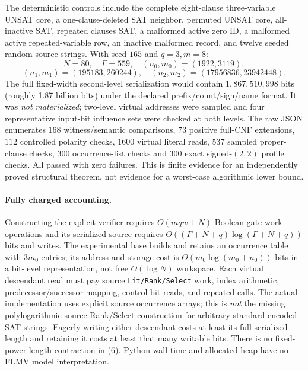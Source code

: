 \documentclass[11pt]{article}
\begin{document}
The deterministic controls include the complete eight-clause three-variable UNSAT core, a one-clause-deleted SAT neighbor, permuted UNSAT core, all-inactive SAT, repeated clauses SAT, a malformed active zero ID, a malformed active repeated-variable row, an inactive malformed record, and twelve seeded random source strings. With seed $165$ and $q=3,m=8$:
\[
 N=80,\quad\Gamma=559,\quad (n_0,m_0)=(1922,3119),\]
\[
 (n_1,m_1)=(195183,260244),\quad
 (n_2,m_2)=(17956836,23942448).\tag{8}
\]
The full fixed-width second-level serialization would contain $1,867,510,998$ bits (roughly 1.87 billion bits) under the declared prefix/count/sign/name format. It was \emph{not materialized}; two-level virtual addresses were sampled and four representative input-bit influence sets were checked at both levels. The raw JSON enumerates $168$ witness/semantic comparisons, $73$ positive full-CNF extensions, $112$ controlled polarity checks, $1600$ virtual literal reads, $537$ sampled proper-clause checks, $300$ occurrence-list checks and $300$ exact signed-$(2,2)$ profile checks. All passed with zero failures. This is finite evidence for an independently proved structural theorem, not evidence for a worst-case algorithmic lower bound.

\paragraph{Fully charged accounting.} Constructing the explicit verifier requires $O(mqw+N)$ Boolean gate-work operations and its serialized source requires $\Theta((\Gamma+N+q)\log(\Gamma+N+q))$ bits and writes. The experimental base builds and retains an occurrence table with $3m_0$ entries; its address and storage cost is $\Theta(m_0\log(m_0+n_0))$ bits in a bit-level representation, not free $O(\log N)$ workspace. Each virtual descendant read must pay source \texttt{Lit/Rank/Select} work, index arithmetic, predecessor/successor mapping, control-bit reads, and repeated calls. The actual implementation uses explicit source occurrence arrays; this is \emph{not} the missing polylogarithmic source Rank/Select construction for arbitrary standard encoded SAT strings. Eagerly writing either descendant costs at least its full serialized length and retaining it costs at least that many writable bits. There is no fixed-power length contraction in (6). Python wall time and allocated heap have no FLMV model interpretation.
\end{document}
